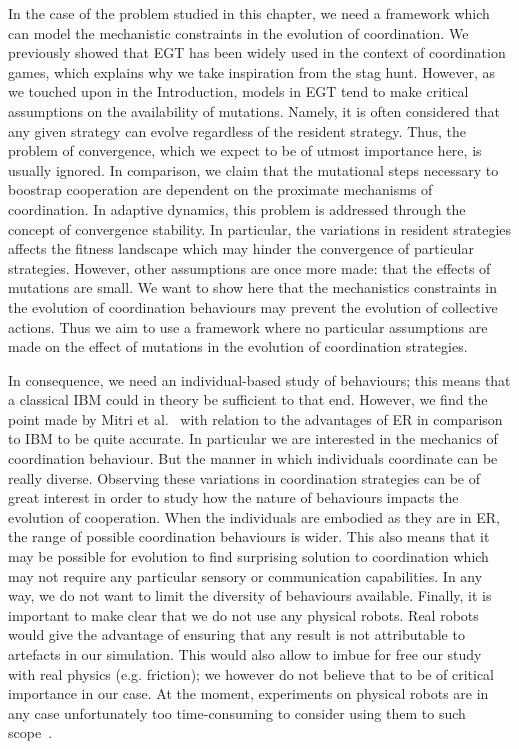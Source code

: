     In the case of the problem studied in this chapter, we need a framework which can model the mechanistic constraints in the evolution of coordination. We previously showed that EGT has been widely used in the context of coordination games, which explains why we take inspiration from the stag hunt. However, as we touched upon in the Introduction, models in EGT tend to make critical assumptions on the availability of mutations. Namely, it is often considered that any given strategy can evolve regardless of the resident strategy. Thus, the problem of convergence, which we expect to be of utmost importance here, is usually ignored. In comparison, we claim that the mutational steps necessary to boostrap cooperation are dependent on the proximate mechanisms of coordination. In adaptive dynamics, this problem is addressed through the concept of convergence stability. In particular, the variations in resident strategies affects the fitness landscape which may hinder the convergence of particular strategies. However, other assumptions are once more made: that the effects of mutations are small. We want to show here that the mechanistics constraints in the evolution of coordination behaviours may prevent the evolution of collective actions. Thus we aim to use a framework where no particular assumptions are made on the effect of mutations in the evolution of coordination strategies.

    In consequence, we need an individual-based study of behaviours; this means that a classical IBM could in theory be sufficient to that end. However, we find the point made by Mitri et al.~\parencite{Mitri2012} with relation to the advantages of ER in comparison to IBM to be quite accurate. In particular we are interested in the mechanics of coordination behaviour. But the manner in which individuals coordinate can be really diverse. Observing these variations in coordination strategies can be of great interest in order to study how the nature of behaviours impacts the evolution of cooperation. When the individuals are embodied as they are in ER, the range of possible coordination behaviours is wider. This also means that it may be possible for evolution to find surprising solution to coordination which may not require any particular sensory or communication capabilities. In any way, we do not want to limit the diversity of behaviours available. Finally, it is important to make clear that we do not use any physical robots. Real robots would give the advantage of ensuring that any result is not attributable to artefacts in our simulation. This would also allow to imbue for free our study with real physics (e.g. friction); we however do not believe that to be of critical importance in our case. At the moment, experiments on physical robots are in any case unfortunately too time-consuming to consider using them to such scope~\parencite{Mitri2012, Doncieux2015a}.



